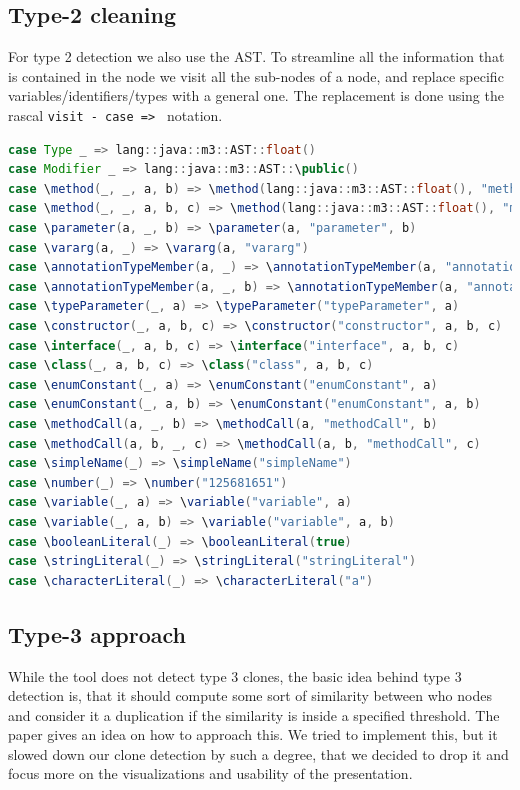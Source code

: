 \documentclass{uva-inf-article}
\begin{document}
\subsection{Type-2 cleaning}

For type 2 detection we also use the AST. To streamline all the information that is contained in the node we visit all the sub-nodes of a node,  and replace specific variables/identifiers/types with a general one. The replacement is done using the rascal \texttt{visit - case => } notation.

\begin{lstlisting}[language=Java, style=mystyle,caption={Node elements stripping method for type-2 clone detection.},captionpos=b]
case Type _ => lang::java::m3::AST::float()
case Modifier _ => lang::java::m3::AST::\public()
case \method(_, _, a, b) => \method(lang::java::m3::AST::float(), "method", a, b)
case \method(_, _, a, b, c) => \method(lang::java::m3::AST::float(), "method", a, b, c)
case \parameter(a, _, b) => \parameter(a, "parameter", b)
case \vararg(a, _) => \vararg(a, "vararg") 
case \annotationTypeMember(a, _) => \annotationTypeMember(a, "annotationTypeMember")
case \annotationTypeMember(a, _, b) => \annotationTypeMember(a, "annotationTypeMember", b)
case \typeParameter(_, a) => \typeParameter("typeParameter", a)
case \constructor(_, a, b, c) => \constructor("constructor", a, b, c)
case \interface(_, a, b, c) => \interface("interface", a, b, c)
case \class(_, a, b, c) => \class("class", a, b, c)
case \enumConstant(_, a) => \enumConstant("enumConstant", a) 
case \enumConstant(_, a, b) => \enumConstant("enumConstant", a, b)
case \methodCall(a, _, b) => \methodCall(a, "methodCall", b)
case \methodCall(a, b, _, c) => \methodCall(a, b, "methodCall", c)
case \simpleName(_) => \simpleName("simpleName")
case \number(_) => \number("125681651")
case \variable(_, a) => \variable("variable", a) 
case \variable(_, a, b) => \variable("variable", a, b) 
case \booleanLiteral(_) => \booleanLiteral(true)
case \stringLiteral(_) => \stringLiteral("stringLiteral")
case \characterLiteral(_) => \characterLiteral("a")
\end{lstlisting}

\subsection{Type-3 approach}
While the tool does not detect type 3 clones, the basic idea behind type 3 detection is, that it should compute some sort of similarity between who nodes and consider it a duplication if the similarity is inside a specified threshold. The paper \cite{baxter1998clone} gives an idea on how to approach this. We tried to implement this, but it slowed down our clone detection by such a degree, that we decided to drop it and focus more on the visualizations and usability of the presentation. 
\end{document}
